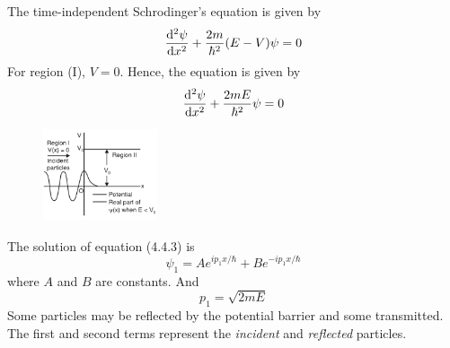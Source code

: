 \documentclass[12pt]{article}
\numberwithin{equation}{subsection}
\begin{document}
The time-independent Schrodinger's equation is given by
\begin{equation}
    \dv[2]{\psi}{x} + \frac{2m}{\hbar^2} (E-V)\psi = 0
\end{equation}
For region (I), $V=0$. Hence, the equation is given by
\begin{equation}
    \dv[2]{\psi}{x} + \frac{2mE}{\hbar^2} \psi = 0
\end{equation}

\begin{figure}[htpb]
    \centering
    \includegraphics[width=0.3\textwidth]{potential step.png}
\end{figure}

The solution of equation (4.4.3) is
\begin{equation}
    \psi_1 = A e^{ip_1x/\hbar} + B e^{-ip_1x/\hbar}
\end{equation}
where $A$ and $B$ are constants. And \[
    p_1 = \sqrt{2mE}
\]
Some particles may be reflected by the potential barrier and some transmitted. The first and second terms represent the \textit{incident} and \textit{reflected} particles. \\~\\
\end{document}
